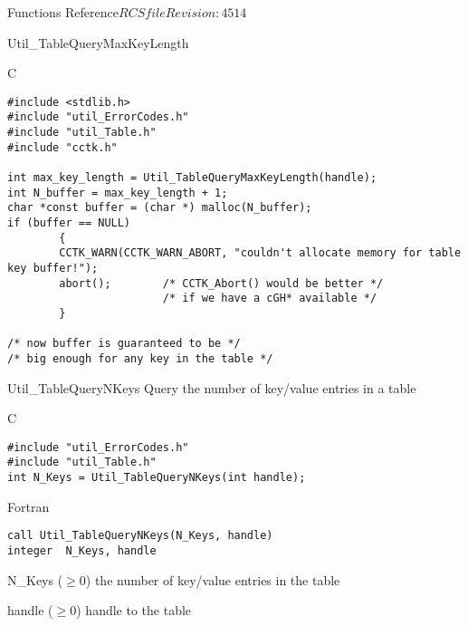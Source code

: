 \begin{cactuspart}{ Functions Reference}{$RCSfile$}{$Revision: 4514 $}
\begin{FunctionDescription}{Util\_TableQueryMaxKeyLength}
\begin{ExampleSection}
\begin{Example}{C}
\begin{verbatim}
#include <stdlib.h>
#include "util_ErrorCodes.h"
#include "util_Table.h"
#include "cctk.h"

int max_key_length = Util_TableQueryMaxKeyLength(handle);
int N_buffer = max_key_length + 1;
char *const buffer = (char *) malloc(N_buffer);
if (buffer == NULL)
        {
        CCTK_WARN(CCTK_WARN_ABORT, "couldn't allocate memory for table key buffer!");
        abort();        /* CCTK_Abort() would be better */
                        /* if we have a cGH* available */
        }

/* now buffer is guaranteed to be */
/* big enough for any key in the table */
\end{verbatim}
\end{Example}
\end{ExampleSection}
\end{FunctionDescription}


\begin{FunctionDescription}{Util\_TableQueryNKeys}
\label{Util-TableQueryNKeys}
Query the number of key/value entries in a table

\begin{SynopsisSection}
\begin{Synopsis}{C}
\begin{verbatim}
#include "util_ErrorCodes.h"
#include "util_Table.h"
int N_Keys = Util_TableQueryNKeys(int handle);
\end{verbatim}
\end{Synopsis}
\begin{Synopsis}{Fortran}
\begin{verbatim}
call Util_TableQueryNKeys(N_Keys, handle)
integer  N_Keys, handle
\end{verbatim}
\end{Synopsis}
\end{SynopsisSection}

\begin{ResultSection}
\begin{Result}{N\_Keys ($\ge 0$)}
the number of key/value entries in the table
\end{Result}
\end{ResultSection}

\begin{ParameterSection}
\begin{Parameter}{handle ($\ge 0$)}
handle to the table
\end{Parameter}
\end{ParameterSection}


\end{FunctionDescription}
\end{cactuspart}
